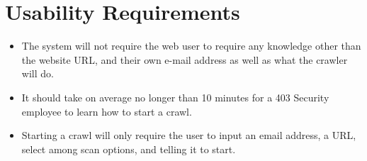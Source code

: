 \section{Usability Requirements}
\begin{itemize}
    \item The system will not require the web user to require any knowledge other than the website URL, and their own e-mail address as well as what the crawler will do.
    \item It should take on average no longer than 10 minutes for a 403 Security employee to learn how to start a crawl.
    \item Starting a crawl will only require the user to input an email address, a URL, select among scan options, and telling it to start.
\end{itemize}
